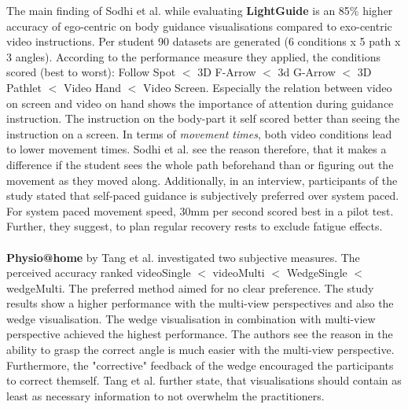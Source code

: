 The main finding of Sodhi et al. while evaluating \textbf{LightGuide} is an 85\% higher accuracy of ego-centric on body guidance visualisations compared to exo-centric video instructions.
Per student 90 datasets are generated (6 conditions x 5 path x 3 angles). According to the performance measure they applied, the conditions scored (best to worst): Follow Spot $<$ 3D F-Arrow $<$ 3d G-Arrow $<$ 3D Pathlet $<$ Video Hand $<$ Video Screen. Especially the relation between video on screen and video on hand shows the importance of attention during guidance instruction. The instruction on the body-part it self scored better than seeing the instruction on a screen. In terms of \textit{movement times}, both video conditions lead to lower movement times. Sodhi et al. see the reason therefore, that it makes a difference if the student sees the whole path beforehand than or figuring out the movement as they moved along. Additionally, in an interview, participants of the study stated that self-paced guidance is subjectively preferred over system paced. For system paced movement speed, 30mm per second scored best in a pilot test. Further, they suggest, to plan regular recovery rests to exclude fatigue effects.\\ \\
\textbf{Physio@home} by Tang et al. \cite{Tang2015} investigated two subjective measures. The perceived accuracy ranked videoSingle $<$ videoMulti $<$ WedgeSingle $<$ wedgeMulti. The preferred method aimed for no clear preference. The study results show a higher performance with the multi-view perspectives and also the wedge visualisation. The wedge visualisation in combination with multi-view perspective achieved the highest performance. The authors see the reason in the ability to grasp the correct angle is much easier with the multi-view perspective. Furthermore, the "corrective" feedback of the wedge encouraged the participants to correct themself. Tang et al. further state, that visualisations should contain as least as necessary information to not overwhelm the practitioners. 
